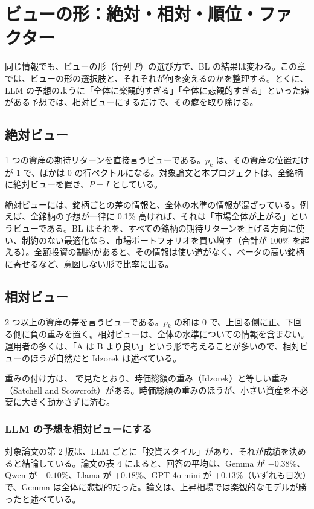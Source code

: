 \chapter{ビューの形：絶対・相対・順位・ファクター}\label{ch:shape}

同じ情報でも、ビューの形（行列 $P$）の選び方で、BL の結果は変わる。この章では、ビューの形の選択肢と、それぞれが何を変えるのかを整理する。とくに、LLM の予想のように「全体に楽観的すぎる」「全体に悲観的すぎる」といった癖がある予想では、相対ビューにするだけで、その癖を取り除ける。

\section{絶対ビュー}

1 つの資産の期待リターンを直接言うビューである。$p_k$ は、その資産の位置だけが 1 で、ほかは 0 の行ベクトルになる。対象論文と本プロジェクトは、全銘柄に絶対ビューを置き、$P=I$ としている。

絶対ビューには、銘柄ごとの差の情報と、全体の水準の情報が混ざっている。例えば、全銘柄の予想が一律に 0.1\% 高ければ、それは「市場全体が上がる」というビューである。BL はそれを、すべての銘柄の期待リターンを上げる方向に使い、制約のない最適化なら、市場ポートフォリオを買い増す（合計が 100\% を超える）。全額投資の制約があると、その情報は使い道がなく、ベータの高い銘柄に寄せるなど、意図しない形で比率に出る。

\section{相対ビュー}

2 つ以上の資産の差を言うビューである。$p_k$ の和は 0 で、上回る側に正、下回る側に負の重みを置く。相対ビューは、全体の水準についての情報を含まない。運用者の多くは、「A は B より良い」という形で考えることが多いので、相対ビューのほうが自然だと Idzorek は述べている。

重みの付け方は、 で見たとおり、時価総額の重み（Idzorek）と等しい重み（Satchell and Scowcroft）がある。時価総額の重みのほうが、小さい資産を不必要に大きく動かさずに済む。

\subsection*{LLM の予想を相対ビューにする}

対象論文の第 2 版は、LLM ごとに「投資スタイル」があり、それが成績を決めると結論している。論文の表 4 によると、回答の平均は、Gemma が $-0.38$\%、Qwen が $+0.10$\%、Llama が $+0.18$\%、GPT-4o-mini が $+0.13$\%（いずれも日次）で、Gemma は全体に悲観的だった。論文は、上昇相場では楽観的なモデルが勝ったと述べている。

